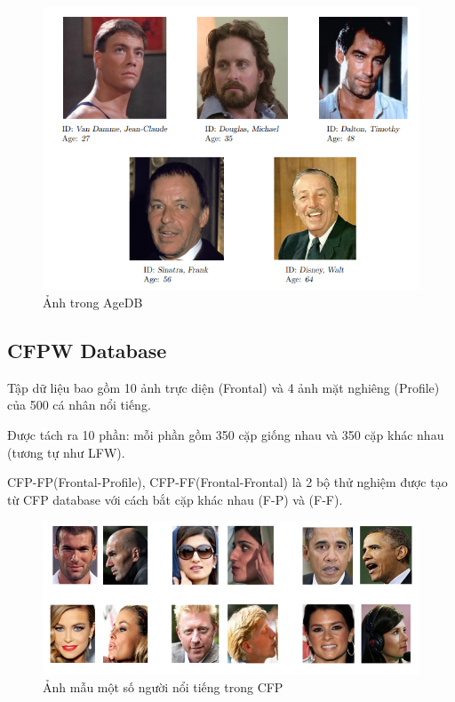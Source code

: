 \documentclass[a4paper, 12pt]{article}
\begin{document}
    \begin{figure}[H]
        \begin{center}
            \includegraphics[scale=0.5]{img/AgeDB2}
            \caption{Ảnh trong AgeDB}
        \end{center}
    \end{figure}

\subsection{CFPW Database}
Tập dữ liệu bao gồm 10 ảnh trực diện (Frontal) và 4 ảnh mặt nghiêng (Profile) của 500 cá nhân nổi tiếng. 

Được tách ra 10 phần: mỗi phần gồm 350 cặp giống nhau và 350 cặp khác nhau (tương tự như LFW).

CFP-FP(Frontal-Profile), CFP-FF(Frontal-Frontal) là 2 bộ thử nghiệm được tạo từ CFP database với cách bắt cặp khác nhau (F-P) và (F-F).

    \begin{figure}[H]
        \begin{center}
            \includegraphics[scale=0.5]{img/CFP.png}
            \caption{Ảnh mẫu một số người nổi tiếng trong CFP}
        \end{center}
    \end{figure}
\end{document}
